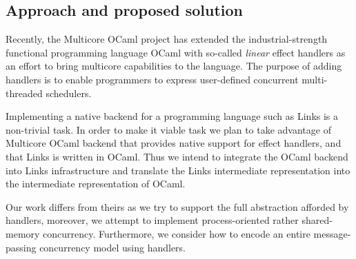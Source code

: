 \documentclass[12pt,mscres,cdtppar,twoside,openright,logo,rightchapter,normalheadings]{infthesis}
\theoremstyle{definition}
\newcommand{\todo}[1]{{\par\noindent\small\color{red} \framebox{\parbox{\dimexpr\linewidth-2\fboxsep-2\fboxrule}{\textbf{TODO:} #1}}}}
\begin{document}
\subsection{Approach and proposed solution}

Recently, the Multicore OCaml project \citep{Dolan2015} has extended
the industrial-strength functional programming language OCaml with
so-called \emph{linear} effect handlers as an effort to bring
multicore capabilities to the language. The purpose of adding handlers
is to enable programmers to express user-defined concurrent
multi-threaded schedulers.

Implementing a native backend for a programming language such as Links
is a non-trivial task. In order to make it viable task we plan to take
advantage of Multicore OCaml backend that provides native support for
effect handlers, and that Links is written in OCaml. Thus we intend to
integrate the OCaml backend into Links infrastructure and translate
the Links intermediate representation into the intermediate
representation of OCaml.

Our work differs from theirs as we try to support the full abstraction
afforded by handlers, moreover, we attempt to implement
process-oriented rather shared-memory concurrency. Furthermore, we
consider how to encode an entire message-passing concurrency model
using handlers.




\end{document}
